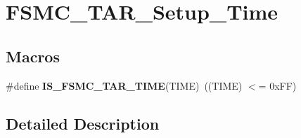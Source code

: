 \hypertarget{group___f_s_m_c___t_a_r___setup___time}{\section{F\-S\-M\-C\-\_\-\-T\-A\-R\-\_\-\-Setup\-\_\-\-Time}
\label{group___f_s_m_c___t_a_r___setup___time}
}
\subsection*{Macros}
\begin{DoxyCompactItemize}
\item 
\hypertarget{group___f_s_m_c___t_a_r___setup___time_ga5b9e0f64c44ab68afca90cd28dedd8e3}{\#define {\bfseries I\-S\-\_\-\-F\-S\-M\-C\-\_\-\-T\-A\-R\-\_\-\-T\-I\-M\-E}(T\-I\-M\-E)~((T\-I\-M\-E) $<$= 0x\-F\-F)}\label{group___f_s_m_c___t_a_r___setup___time_ga5b9e0f64c44ab68afca90cd28dedd8e3}

\end{DoxyCompactItemize}


\subsection{Detailed Description}
